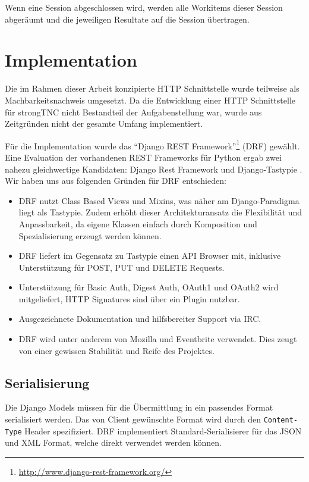 Wenn eine Session abgeschlossen wird, werden alle Workitems dieser Session
abgeräumt und die jeweiligen Resultate auf die Session übertragen.

\section{Implementation}

Die im Rahmen dieser Arbeit konzipierte HTTP Schnittstelle wurde teilweise als
Machbarkeitsnachweis umgesetzt. Da die Entwicklung einer HTTP Schnittstelle für
strongTNC nicht Bestandteil der Aufgabenstellung war, wurde aus Zeitgründen
nicht der gesamte Umfang implementiert.

Für die Implementation wurde das \enquote{Django REST
Framework}\footnote{\url{http://www.django-rest-framework.org/}} (DRF) gewählt.
Eine Evaluation der vorhandenen REST Frameworks für Python ergab zwei nahezu
gleichwertige Kandidaten: Django Rest Framework und Django-Tastypie
\cite{greenfeld2012rest}. Wir haben uns aus folgenden Gründen für DRF
entschieden:

\begin{itemize}
	\item DRF nutzt Class Based Views und Mixins, was näher am Django-Paradigma
		liegt als Tastypie. Zudem erhöht dieser Architekturansatz die Flexibilität
		und Anpassbarkeit, da eigene Klassen einfach durch Komposition und
		Spezialisierung erzeugt werden können.
	\item DRF liefert im Gegensatz zu Tastypie einen API Browser mit, inklusive
		Unterstützung für POST, PUT und DELETE Requests.
	\item Unterstützung für Basic Auth, Digest Auth, OAuth1 und OAuth2 wird
		mitgeliefert, HTTP Signatures sind über ein Plugin nutzbar.
	\item Ausgezeichnete Dokumentation und hilfsbereiter Support via IRC.
	\item DRF wird unter anderem von Mozilla und Eventbrite verwendet. Dies zeugt
		von einer gewissen Stabilität und Reife des Projektes.
\end{itemize}

\subsection{Serialisierung}
\label{api:serialisierung}
Die Django Models müssen für die Übermittlung in ein passendes Format
serialisiert werden. Das von Client gewünschte Format wird durch den
\texttt{Content-Type} Header spezifiziert. DRF implementiert
Standard-Serialisierer für das JSON und XML Format, welche direkt verwendet
werden können.

